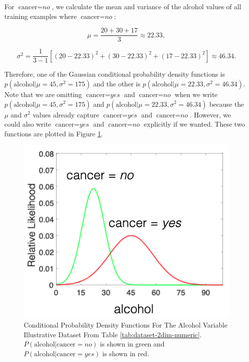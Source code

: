 For $\text{cancer} = \textit{no}$, we calculate the mean and variance of the alcohol values of all training examples where $\text{cancer} = \textit{no}$:

\[ \mu = \frac{20 + 30 + 17}{3} \approx 22.33,\]

\[ \sigma^2 = \frac{1}{3-1} [(20 - 22.33)^2+(30 - 22.33)^2+(17 - 22.33)^2] \approx 46.34.\]

Therefore, one of the Gaussian conditional probability density functions is $p(\text{alcohol}|\mu=45,\sigma^2=175)$ and the other is $p(\text{alcohol}|\mu=22.33,\sigma^2=46.34)$. Note that we are omitting $\text{cancer}=\textit{yes}$ and $\text{cancer}=\textit{no}$ when we write $p(\text{alcohol}|\mu=45,\sigma^2=175)$ and $p(\text{alcohol}|\mu=22.33,\sigma^2=46.34)$ because the $\mu$ and $\sigma^2$ values already capture $\text{cancer}=\textit{yes}$ and $\text{cancer}=\textit{no}$. However, we could also write $\text{cancer}=\textit{yes}$ and $\text{cancer}=\textit{no}$ explicitly if we wanted. These two functions are plotted in Figure \ref{fig:nb-gaussian-pdfs}.

\begin{figure}[h]
\centering
\includegraphics[scale=0.3]{"Part 3 - Learning Systems/Supervised Learning/Naive Bayes/figures/nb-gaussian-pdfs.png"} %
\caption{Conditional Probability Density Functions For The Alcohol Variable Illustrative Dataset From Table \ref{tab:dataset-2dim-numeric}. $P(\text{alcohol}|\text{cancer}=\textit{no})$ is shown in green and $P(\text{alcohol}|\text{cancer}=\textit{yes})$ is shown in red.} \label{fig:nb-gaussian-pdfs}
\end{figure}


